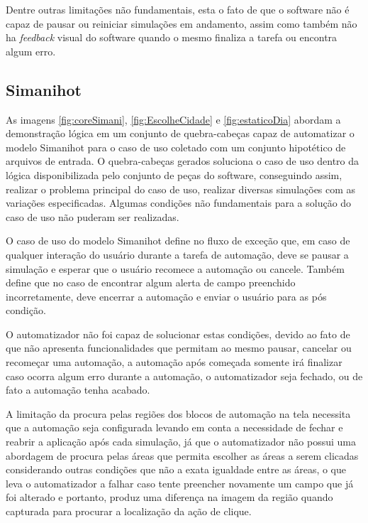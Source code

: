 \documentclass[tg]{mdtufsm}
\begin{document}
                Dentre outras limitações não fundamentais, esta o fato de que o software não é capaz de pausar ou reiniciar simulações em andamento, assim como também não ha \emph{feedback} visual do software quando o mesmo finaliza a tarefa ou encontra algum erro.

                \subsection {Simanihot}

                    As imagens \ref{fig:coreSimani}, \ref{fig:EscolheCidade} e \ref{fig:estaticoDia} abordam a demonstração lógica em um conjunto de quebra-cabeças capaz de automatizar o modelo Simanihot para o caso de uso coletado com um conjunto hipotético de arquivos de entrada. O quebra-cabeças gerados soluciona o caso de uso dentro da lógica disponibilizada pelo conjunto de peças do software, conseguindo assim, realizar o problema principal do caso de uso, realizar diversas simulações com as variações especificadas. Algumas condições não fundamentais para a solução do caso de uso não puderam ser realizadas.

                    O caso de uso do modelo Simanihot define no fluxo de exceção que, em caso de qualquer interação do usuário durante a tarefa de automação, deve se pausar a simulação e esperar que o usuário recomece a automação ou cancele. Também define que no caso de encontrar algum alerta de campo preenchido incorretamente, deve encerrar a automação e enviar o usuário para as pós condição.

                    O automatizador não foi capaz de solucionar estas condições, devido ao fato de que não apresenta funcionalidades que permitam ao mesmo pausar, cancelar ou recomeçar uma automação, a automação após começada somente irá finalizar caso ocorra algum erro durante a automação, o automatizador seja fechado, ou de fato a automação tenha acabado.

                    A limitação da procura pelas regiões dos blocos de automação na tela necessita que a automação seja configurada levando em conta a necessidade de fechar e reabrir a aplicação após cada simulação, já que o automatizador não possui uma abordagem de procura pelas áreas que permita escolher as áreas a serem clicadas considerando outras condições que não a exata igualdade entre as áreas, o que leva o automatizador a falhar caso tente preencher novamente um campo que já foi alterado e portanto, produz uma diferença na imagem da região quando capturada para procurar a localização da ação de clique.
\end{document}
